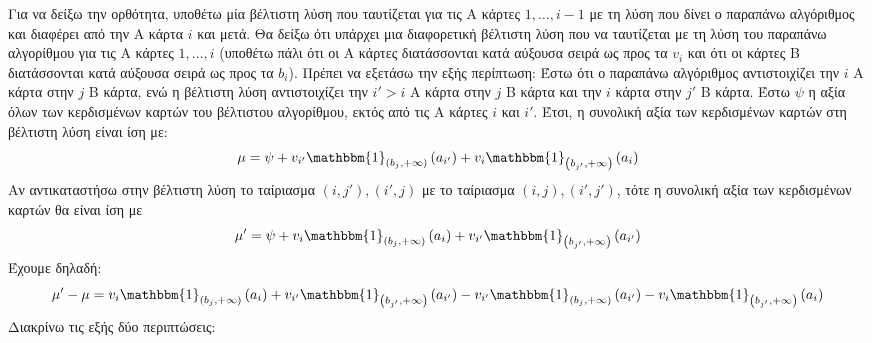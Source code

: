 \documentclass[12pt]{article}
\begin{document}
Για να δείξω την ορθότητα, υποθέτω μία βέλτιστη λύση που ταυτίζεται για τις Α κάρτες $1,\ldots,i-1$ με τη λύση που δίνει ο παραπάνω αλγόριθμος και διαφέρει από την Α κάρτα $i$ και μετά. Θα δείξω ότι υπάρχει μια διαφορετική βέλτιστη λύση που να ταυτίζεται με τη λύση του παραπάνω αλγορίθμου για τις Α κάρτες $1,\ldots,i$ (υποθέτω πάλι ότι οι Α κάρτες διατάσσονται κατά αύξουσα σειρά ως προς τα $v_i$ και ότι οι κάρτες Β διατάσσονται κατά αύξουσα σειρά ως προς τα $b_i$). Πρέπει να εξετάσω την εξής περίπτωση: Έστω ότι ο παραπάνω αλγόριθμος αντιστοιχίζει την $i$ Α κάρτα στην $j$ Β κάρτα, ενώ η βέλτιστη λύση αντιστοιχίζει την $i'>i$ Α κάρτα στην $j$ Β κάρτα και την $i$ κάρτα στην $j'$ Β κάρτα. Έστω $\psi$ η αξία όλων των κερδισμένων καρτών του βέλτιστου αλγορίθμου, εκτός από τις Α κάρτες $i$ και $i'$. Έτσι, η συνολική αξία των κερδισμένων καρτών στη βέλτιστη λύση είναι ίση με:
$$\mu=\psi+v_{i'}\mathbbm{1}_{\left(b_j,+\infty\right)}\left(a_{i'}\right)+v_i\mathbbm{1}_{\left(b_{j'},+\infty\right)}\left(a_i\right)$$
Αν αντικαταστήσω στην βέλτιστη λύση το ταίριασμα $(i,j'),(i',j)$ με το ταίριασμα $(i,j),(i',j')$, τότε η συνολική αξία των κερδισμένων καρτών θα είναι ίση με
$$\mu'=\psi+v_i\mathbbm{1}_{\left(b_j,+\infty\right)}\left(a_i\right)+v_{i'}\mathbbm{1}_{\left(b_{j'},+\infty\right)}\left(a_{i'}\right)$$
Έχουμε δηλαδή:
$$\mu'-\mu=v_i\mathbbm{1}_{\left(b_j,+\infty\right)}\left(a_i\right)+v_{i'}\mathbbm{1}_{\left(b_{j'},+\infty\right)}\left(a_{i'}\right)-v_{i'}\mathbbm{1}_{\left(b_j,+\infty\right)}\left(a_{i'}\right)-v_i\mathbbm{1}_{\left(b_{j'},+\infty\right)}\left(a_i\right)$$
Διακρίνω τις εξής δύο περιπτώσεις:
\end{document}
